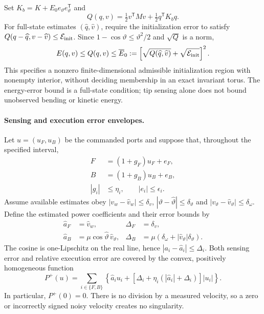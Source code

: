 Set $K_b=K+E_0e_\vartheta e_\vartheta^{\mathsf T}$ and
\begin{equation}
 Q(q,v)=\tfrac12v^{\mathsf T}Mv+\tfrac12q^{\mathsf T}K_bq.
 \label{eq:operational-initial-metric}
\end{equation}
For full-state estimates $(\widehat q,\widehat v)$, require the initialization
error to satisfy $Q(q-\widehat q,v-\widehat v)\leq\mathcal E_{\rm init}$.
Since $1-\cos\vartheta\leq\vartheta^2/2$ and $\sqrt Q$ is a norm,
\begin{equation}
 E(q,v)\leq Q(q,v)\leq\overline E_0
 :=\left[\sqrt{Q(\widehat q,\widehat v)}
                  +\sqrt{\mathcal E_{\rm init}}\right]^2.
 \label{eq:operational-initial-energy}
\end{equation}
This specifies a nonzero finite-dimensional admissible initialization
region with nonempty interior, without deciding membership in an exact
invariant torus.
The energy-error bound is a full-state condition; tip sensing alone does
not bound unobserved bending or kinetic energy.

\paragraph{Sensing and execution error envelopes.}
Let $u=(u_F,u_B)$ be the commanded ports and suppose that, throughout the
specified interval,
\begin{equation}
 \begin{aligned}
 F&=(1+g_F)u_F+e_F,\\
 B&=(1+g_B)u_B+e_B,\\
 |g_i|&\leq\eta_i,\qquad |e_i|\leq\epsilon_i.
 \end{aligned}
 \label{eq:operational-actuator-envelope}
\end{equation}
Assume available estimates obey
$|v_w-\widehat v_w|\leq\delta_v$,
$|\vartheta-\widehat\vartheta|\leq\delta_\vartheta$ and
$|v_\vartheta-\widehat v_\vartheta|\leq\delta_\omega$.
Define the estimated power coefficients and their error bounds by
\begin{equation}
 \begin{aligned}
 \widehat a_F&=\widehat v_w,&\Delta_F&=\delta_v,\\
 \widehat a_B&=\mu\cos\widehat\vartheta\,\widehat v_\vartheta,
 &\Delta_B&=\mu(\delta_\omega+
                         |\widehat v_\vartheta|\delta_\vartheta).
 \end{aligned}
 \label{eq:operational-port-estimation}
\end{equation}
The cosine is one-Lipschitz on the real line, hence $|a_i-\widehat a_i|
\leq\Delta_i$. Both sensing error and relative execution error are covered
by the convex, positively homogeneous function
\begin{equation}
 P^+(u)=\sum_{i\in\{F,B\}}
 \left\{\widehat a_i u_i+
 [\Delta_i+\eta_i(|\widehat a_i|+\Delta_i)]|u_i|\right\}.
 \label{eq:operational-robust-power}
\end{equation}
In particular, $P^+(0)=0$. There is no division by a measured velocity,
so a zero or incorrectly signed noisy velocity creates no singularity.

